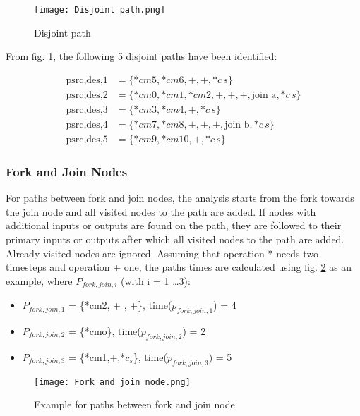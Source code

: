 \documentclass[conference]{IEEEtran}
\begin{document}
\begin{figure}[h!]
    \centering
    \texttt{[image: Disjoint path.png]}
    \caption{Disjoint path \cite{Ret}}
    \label{fig:disjoint path}
\end{figure}

From fig. \ref{fig:disjoint path}, the following 5 disjoint paths have been identified:

\begin{align*}
\text{psrc,des,1} &= \{\ast cm5, \ast cm6, +, +, \ast c\,s\}\\
\text{psrc,des,2} &= \{\ast cm0, \ast cm1, \ast cm2, +, +, +, \text{join a}, \ast c\,s\} \\
\text{psrc,des,3} &= \{\ast cm3, \ast cm4, +, \ast c\,s\} \\
\text{psrc,des,4} &= \{\ast cm7, \ast cm8, +, +, +, \text{join b}, \ast c\,s\} \\
\text{psrc,des,5} &= \{\ast cm9, \ast cm10, +, \ast c\,s\}
\end{align*}


\subsubsection{Fork and Join Nodes}
For paths between fork and join nodes, the analysis starts from the fork towards the join node and all visited nodes to the path are added. If nodes with additional inputs or outputs are found on the path, they are followed to their primary inputs or outputs after which all visited nodes to the path are added. Already visited nodes are ignored. Assuming that operation * needs two timesteps and operation + one, the paths times are calculated using fig. \ref{fig:fork and join} as an example, where $P_{fork,join,i}$ (with i = 1 \ldots 3): 
\begin{itemize}
    \item $P_{fork,join,1}$ = \{*cm2, + , +\}, time($p_{fork,join,1}$) = 4
    \item $P_{fork,join,2}$ = \{*cmo\}, time($p_{fork,join,2}$) = 2 
    \item $P_{fork,join,3}$ = \{*cm1,+,*$c_s$\}, time($p_{fork,join,3}$) = 5
\end{itemize}

\begin{figure}[h!]
    \centering
    \texttt{[image: Fork and join node.png]}
    \caption{Example for paths between fork and join node \cite{10.1007/978-0-387-39362-9_24}}
    \label{fig:fork and join}
\end{figure}
\end{document}
